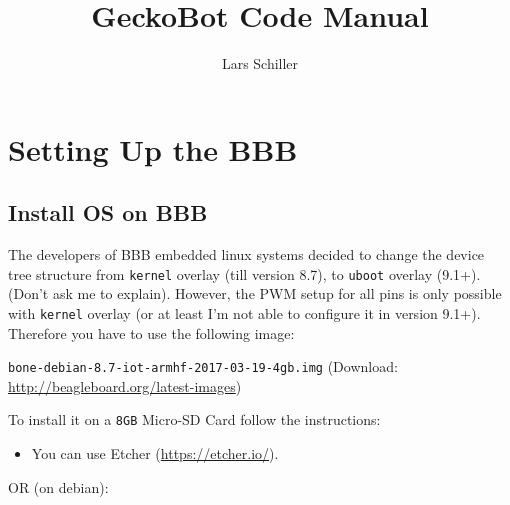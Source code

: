 \documentclass[
	fontsize=10pt
	paper=a4
]{scrartcl}
\author{Lars Schiller}
\title{GeckoBot Code Manual}
\begin{document}
\maketitle
\tableofcontents




\section{Setting Up the BBB}




\subsection{Install OS on BBB}

The developers of BBB embedded linux systems decided to change the device tree structure from \texttt{kernel} overlay (till version 8.7), to \texttt{uboot} overlay (9.1+). (Don't ask me to explain).
However, the PWM setup for all pins is only possible with \texttt{kernel} overlay (or at least I'm not able to configure it in version 9.1+).
Therefore you have to use the following image:

\texttt{bone-debian-8.7-iot-armhf-2017-03-19-4gb.img}
(Download: \url{http://beagleboard.org/latest-images})

To install it on a \texttt{8GB} Micro-SD Card follow the instructions:

\begin{itemize}
\item You can use Etcher (\url{https://etcher.io/}).
\end{itemize}

OR (on debian):
\end{document}
